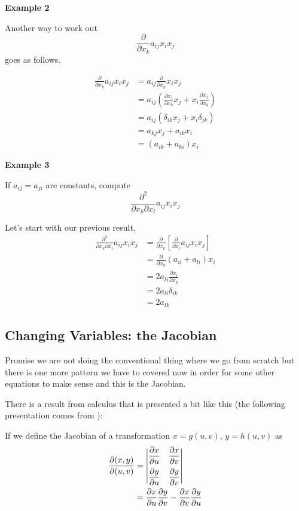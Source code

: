 \textbf{Example 2}

Another way to work out
$$
\frac{\partial}{\partial x_k} a_{ij} x_i x_j
$$
goes as follows.

\begin{align*}
\frac{\partial}{\partial x_k} a_{ij} x_i x_j &= a_{ij} \frac{\partial}{\partial x_k} x_i x_j \\
&= a_{ij} \left( \frac{\partial x_i}{\partial x_k} x_j + x_i \frac{\partial x_j}{\partial x_k} \right) \\
&= a_{ij} \left( \delta_{ik} x_j + x_i \delta_{jk} \right) \\
&= a_{kj} x_j + a_{ik} x_i \\
&= (a_{ik} + a_{ki}) x_i
\end{align*}


\textbf{Example 3}

If $a_{ij} = a_{ji}$ are constants, compute
$$
\frac{\partial^2}{\partial x_k \partial x_l} a_{ij} x_i x_j
$$

Let's start with our previous result,
\begin{align*}
\frac{\partial^2}{\partial x_k \partial x_l} a_{ij} x_i x_j &=
    \frac{\partial}{\partial x_k} \left[ \frac{\partial}{\partial x_l} a_{ij} x_i x_j \right] \\
&= \frac{\partial}{\partial x_k} (a_{il} + a_{li}) x_i \\
&= 2 a_{li} \frac{\partial x_i}{\partial x_k} \\
&= 2 a_{li} \delta_{ik} \\
&= 2 a_{lk}
\end{align*}



\subsection{Changing Variables: the Jacobian} \label{subsection:jacobian}


Promise we are not doing the conventional thing where we go from scratch but there is one more pattern we have to covered
now in order for some other equations to make sense and this is the Jacobian.


There is a result from calculus that is presented a bit like this (the following presentation comes from
\cite{jacobian}):


If we define the Jacobian of a transformation $x = g(u,v)$, $y = h(u,v)$ as
\begin{align*}
\frac{ \partial (x,y) }{ \partial (u,v) } &= 
\begin{vmatrix}
\dfrac{ \partial x }{ \partial u } & \dfrac{ \partial x }{ \partial v } \\ \addlinespace
\dfrac{ \partial y }{ \partial u } & \dfrac{ \partial y }{ \partial v }
\end{vmatrix} \\
&= \frac{ \partial x }{ \partial u } \frac{ \partial y }{ \partial v } -
    \frac{ \partial x }{ \partial v }\frac{ \partial y }{ \partial u }
\end{align*}

